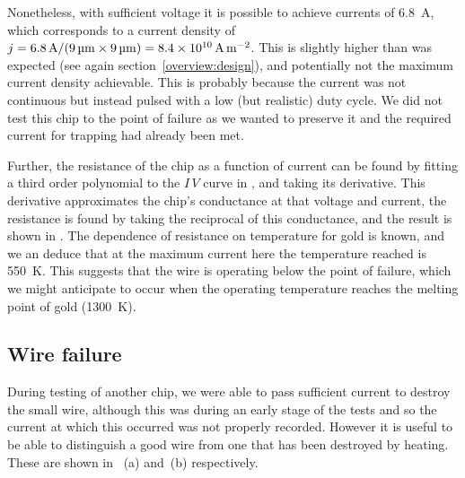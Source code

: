 Nonetheless, with sufficient voltage it is possible to achieve currents of
\SI{6.8}{\ampere}, which  corresponds to a current density of
$j=\SI{6.8}{\ampere}/(\SI{9}{\micro\meter}\times\SI{9}{\micro\meter})=
\SI{8.4E10}{\ampere\per\meter\squared}$. This is slightly higher than was
expected (see again section~\ref{overview:design}), and potentially not the
maximum current density achievable. This is probably because the current was
not continuous but instead pulsed with a low (but realistic) duty cycle. We did
not test this chip to the point of failure as we wanted to preserve it and the
required current for trapping had already been met.

Further, the resistance of the chip as a function of current can be found by
fitting a third order polynomial to the $I\,V$ curve in
, and taking its derivative. This derivative
approximates the chip's conductance at that voltage and current, the resistance
is found by taking the reciprocal of this conductance, and the result is
shown in . The dependence of resistance on
temperature for gold is known, and we an deduce that at the maximum current
here the temperature reached is \SI{550}{\kelvin}. This suggests that the wire
is operating below the point of failure, which we might anticipate to occur
when the operating temperature reaches the melting point of gold
(\SI{1300}{\kelvin}).

\subsection{Wire failure}

During testing of another chip, we were able to pass sufficient current to
destroy the small wire, although this was during an early stage of the tests
and so the current at which this occurred was not properly recorded. However it
is useful to be able to distinguish a good wire from one that has been
destroyed by heating. These are shown in ~(a)
and~(b) respectively.

